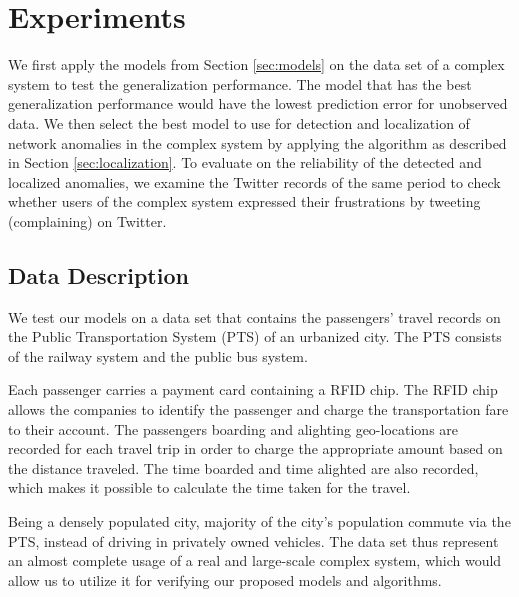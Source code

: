 \documentclass[draft]{sig-alternate}
\begin{document}
\section{Experiments}
\label{sec:experiments}

We first apply the models from Section \ref{sec:models} on the data set of a complex system to test the generalization performance. The model that has the best generalization performance would have the lowest prediction error for unobserved data. We then select the best model to use for detection and localization of network anomalies in the complex system by applying the algorithm as described in Section \ref{sec:localization}. To evaluate on the reliability of the detected and localized anomalies, we examine the Twitter records of the same period to check whether users of the complex system expressed their frustrations by tweeting (complaining) on Twitter.

\subsection{Data Description}

We test our models on a data set that contains the passengers' travel records on the Public Transportation System (PTS) of an urbanized city. The PTS consists of the railway system and the public bus system.


Each passenger carries a payment card containing a RFID chip. The RFID chip allows the companies to identify the passenger and charge the transportation fare to their account. The passengers boarding and alighting geo-locations are recorded for each travel trip in order to charge the appropriate amount based on the distance traveled. The time boarded and time alighted are also recorded, which makes it possible to calculate the time taken for the travel.

Being a densely populated city, majority of the city's population commute via the PTS, instead of driving in privately owned vehicles. The data set thus represent an almost complete usage of a real and large-scale complex system, which would allow us to utilize it for verifying our proposed models and algorithms.
\end{document}
